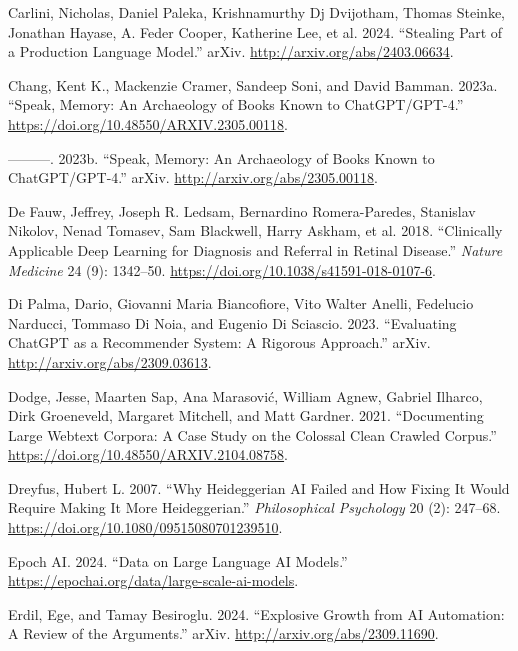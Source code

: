 \documentclass[
  Letterpaper,
]{scrbook}
\newlength{\cslhangindent}
\newenvironment{CSLReferences}[2] %
 {\begin{list}{}{%
  \setlength{\itemindent}{0pt}
  \setlength{\leftmargin}{0pt}
  \setlength{\parsep}{0pt}
  \ifodd #1
   \setlength{\leftmargin}{\cslhangindent}
   \setlength{\itemindent}{-1\cslhangindent}
  \fi
  \setlength{\itemsep}{#2\baselineskip}}}
 {\end{list}}
\begin{document}
\begin{CSLReferences}{1}{0}
Carlini, Nicholas, Daniel Paleka, Krishnamurthy Dj Dvijotham, Thomas
Steinke, Jonathan Hayase, A. Feder Cooper, Katherine Lee, et al. 2024.
{``Stealing {Part} of a {Production} {Language} {Model}.''} arXiv.
\url{http://arxiv.org/abs/2403.06634}.

Chang, Kent K., Mackenzie Cramer, Sandeep Soni, and David Bamman. 2023a.
{``Speak, {Memory}: {An} {Archaeology} of {Books} {Known} to
{ChatGPT}/{GPT}-4.''} \url{https://doi.org/10.48550/ARXIV.2305.00118}.

---------. 2023b. {``Speak, {Memory}: {An} {Archaeology} of {Books}
{Known} to {ChatGPT}/{GPT}-4.''} arXiv.
\url{http://arxiv.org/abs/2305.00118}.

De Fauw, Jeffrey, Joseph R. Ledsam, Bernardino Romera-Paredes, Stanislav
Nikolov, Nenad Tomasev, Sam Blackwell, Harry Askham, et al. 2018.
{``Clinically Applicable Deep Learning for Diagnosis and Referral in
Retinal Disease.''} \emph{Nature Medicine} 24 (9): 1342--50.
\url{https://doi.org/10.1038/s41591-018-0107-6}.

Di Palma, Dario, Giovanni Maria Biancofiore, Vito Walter Anelli,
Fedelucio Narducci, Tommaso Di Noia, and Eugenio Di Sciascio. 2023.
{``Evaluating {ChatGPT} as a {Recommender} {System}: {A} {Rigorous}
{Approach}.''} arXiv. \url{http://arxiv.org/abs/2309.03613}.

Dodge, Jesse, Maarten Sap, Ana Marasović, William Agnew, Gabriel
Ilharco, Dirk Groeneveld, Margaret Mitchell, and Matt Gardner. 2021.
{``Documenting {Large} {Webtext} {Corpora}: {A} {Case} {Study} on the
{Colossal} {Clean} {Crawled} {Corpus}.''}
\url{https://doi.org/10.48550/ARXIV.2104.08758}.

Dreyfus, Hubert L. 2007. {``Why {Heideggerian} {AI} {Failed} and {How}
{Fixing} It {Would} {Require} {Making} It {More} {Heideggerian}.''}
\emph{Philosophical Psychology} 20 (2): 247--68.
\url{https://doi.org/10.1080/09515080701239510}.

Epoch AI. 2024. {``Data on {Large} {Language} {AI} {Models}.''}
\url{https://epochai.org/data/large-scale-ai-models}.

Erdil, Ege, and Tamay Besiroglu. 2024. {``Explosive Growth from {AI}
Automation: {A} Review of the Arguments.''} arXiv.
\url{http://arxiv.org/abs/2309.11690}.


\end{CSLReferences}
\end{document}
